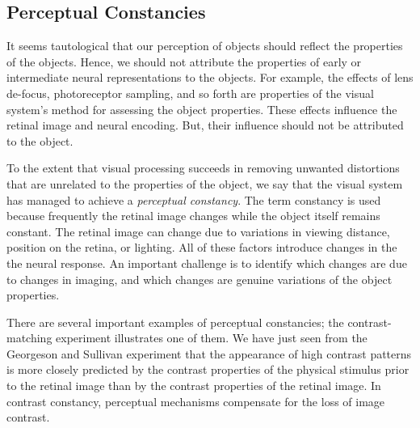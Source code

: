 \subsection{Perceptual Constancies}
%
%
It seems tautological that our
perception of objects
should reflect the properties of the objects.
Hence, we should not attribute the properties of
early or intermediate neural representations
to the objects.
For example, the effects of lens de-focus, photoreceptor sampling,
and so forth are properties of the visual system's
method for assessing the object properties.
These effects influence the retinal image
and neural encoding.
But, their influence should not be attributed
to the object.

To the extent that visual processing succeeds in removing
unwanted distortions
that are unrelated to the properties of the object, 
we say that the visual system has managed to achieve
a {\em perceptual constancy}.
The term constancy is used because frequently
the retinal image changes while the object itself remains constant.
The retinal image can change due to variations
in viewing distance, position on the retina, or lighting.
All of these factors introduce changes in the
the neural response.
An important challenge 
is to identify which changes are due to changes in
imaging, and which changes are genuine
variations of the object properties.

There are several important examples of perceptual constancies;
the contrast-matching experiment illustrates one of them.
We have just seen from the Georgeson and Sullivan experiment 
that the appearance of high contrast
patterns is more closely predicted by the contrast properties
of the physical stimulus prior to the retinal image
than by the contrast properties of the retinal image.
In contrast constancy, perceptual mechanisms compensate
for the loss of image contrast.

